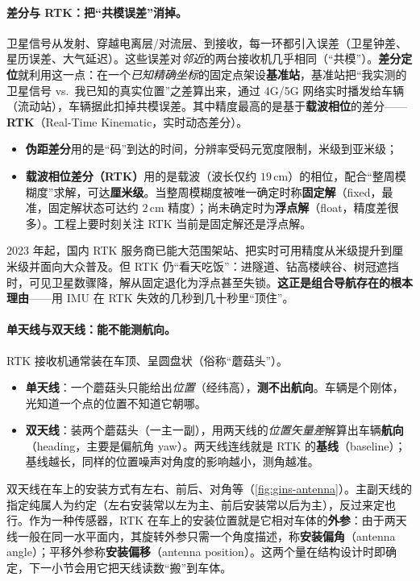 \paragraph{差分与 RTK：把“共模误差”消掉。}
卫星信号从发射、穿越电离层/对流层、到接收，每一环都引入误差（卫星钟差、星历误差、大气延迟）。这些误差对\emph{邻近}的两台接收机几乎相同（“共模”）。\textbf{差分定位}就利用这一点：在一个\emph{已知精确坐标}的固定点架设\textbf{基准站}，基准站把“我实测的卫星信号 vs.\ 我已知的真实位置”之差算出来，通过 4G/5G 网络实时播发给车辆（流动站），车辆据此扣掉共模误差\cite{gao2023slamad}。其中精度最高的是基于\textbf{载波相位}的差分——\textbf{RTK}（Real-Time Kinematic，实时动态差分）。
\begin{itemize}
  \item \textbf{伪距差分}用的是“码”到达的时间，分辨率受码元宽度限制，米级到亚米级；
  \item \textbf{载波相位差分（RTK）}用的是载波（波长仅约 $19$\,cm）的相位，配合“整周模糊度”求解，可达\textbf{厘米级}。当整周模糊度被唯一确定时称\textbf{固定解}（fixed，最准，固定解状态可达约 $2$\,cm 精度\cite{gao2023slamad}）；尚未确定时为\textbf{浮点解}（float，精度差很多）。工程上要时刻关注 RTK 当前是固定解还是浮点解。
\end{itemize}
$2023$ 年起，国内 RTK 服务商已能大范围架站、把实时可用精度从米级提升到厘米级并面向大众普及\cite{gao2023slamad}。但 RTK 仍“看天吃饭”：进隧道、钻高楼峡谷、树冠遮挡时，可见卫星数骤降，解从固定退化为浮点甚至失锁。\textbf{这正是组合导航存在的根本理由}——用 IMU 在 RTK 失效的几秒到几十秒里“顶住”。

\paragraph{单天线与双天线：能不能测航向。}
RTK 接收机通常装在车顶、呈圆盘状（俗称“蘑菇头”）\cite{gao2023slamad}。
\begin{itemize}
  \item \textbf{单天线}：一个蘑菇头只能给出\emph{位置}（经纬高），\textbf{测不出航向}。车辆是个刚体，光知道一个点的位置不知道它朝哪。
  \item \textbf{双天线}：装两个蘑菇头（一主一副），用两天线的\emph{位置矢量差}解算出车辆\textbf{航向}（heading，主要是偏航角 yaw）。两天线连线就是 RTK 的\textbf{基线}（baseline）；基线越长，同样的位置噪声对角度的影响越小，测角越准\cite{gao2023slamad}。
\end{itemize}
双天线在车上的安装方式有左右、前后、对角等（\cref{fig:gins-antenna}）。主副天线的指定纯属人为约定（左右安装常以左为主、前后安装常以后为主），反过来定也行\cite{gao2023slamad}。作为一种传感器，RTK 在车上的安装位置就是它相对车体的\textbf{外参}：由于两天线一般在同一水平面内，其旋转外参只需一个角度描述，称\textbf{安装偏角}（antenna angle）；平移外参称\textbf{安装偏移}（antenna position）。这两个量在结构设计时即确定，下一小节会用它把天线读数“搬”到车体。

